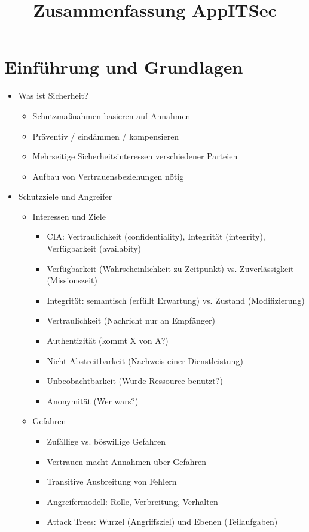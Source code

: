 \documentclass[11pt, paper=a4, twocolumn]{scrartcl}
\title{\vspace{-1.25cm}Zusammenfassung AppITSec\vspace{-0.25cm}}
\date{\vspace{-5ex}}
\begin{document}
	\maketitle


\section{Einführung und Grundlagen}
\begin{itemize}
	\item Was ist Sicherheit?
		\begin{itemize}
			\item Schutzmaßnahmen basieren auf Annahmen
			\item Präventiv / eindämmen / kompensieren
			\item Mehrseitige Sicherheitsinteressen 
				verschiedener Parteien
			\item Aufbau von Vertrauensbeziehungen nötig
		\end{itemize}

	\item Schutzziele und Angreifer
		\begin{itemize}
			\item Interessen und Ziele
				\begin{itemize}
					\item CIA: Vertraulichkeit (confidentiality), 
						Integrität (integrity), Verfügbarkeit 
						(availabity)
					\item Verfügbarkeit (Wahrscheinlichkeit zu 
						Zeitpunkt) vs. Zuverlässigkeit 
						(Missionszeit)
					\item Integrität: semantisch (erfüllt Erwartung) 
						vs. Zustand (Modifizierung)
					\item Vertraulichkeit (Nachricht nur an Empfänger)
					\item Authentizität (kommt X von A?)
					\item Nicht-Abstreitbarkeit (Nachweis einer 
						Dienstleistung)
					\item Unbeobachtbarkeit (Wurde Ressource benutzt?)
					\item Anonymität (Wer wars?)
				\end{itemize}
			\item Gefahren
				\begin{itemize}
					\item Zufällige vs. böswillige Gefahren 
					\item Vertrauen macht Annahmen über Gefahren
					\item Transitive Ausbreitung von Fehlern
					\item Angreifermodell: Rolle, Verbreitung, 
						Verhalten
					\item Attack Trees: Wurzel (Angriffsziel) und 
						Ebenen (Teilaufgaben)
				\end{itemize}


\end{itemize}
\end{itemize}
\end{document}
